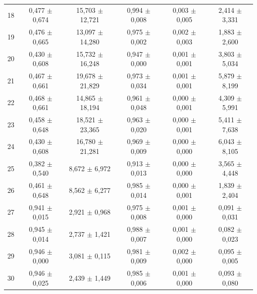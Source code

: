\begin{tabular}{l c c c c c}
18 & 0,477 $\pm$ 0,674 & 15,703 $\pm$ 12,721 & 0,994 $\pm$ 0,008 & 0,003 $\pm$ 0,005 & 2,414 $\pm$ 3,331 \\
19 & 0,476 $\pm$ 0,665 & 13,097 $\pm$ 14,280 & 0,975 $\pm$ 0,002 & 0,002 $\pm$ 0,003 & 1,883 $\pm$ 2,600 \\
20 & 0,430 $\pm$ 0,608 & 15,732 $\pm$ 16,248 & 0,947 $\pm$ 0,000 & 0,001 $\pm$ 0,001 & 3,803 $\pm$ 5,034 \\
21 & 0,467 $\pm$ 0,661 & 19,678 $\pm$ 21,829 & 0,973 $\pm$ 0,034 & 0,001 $\pm$ 0,001 & 5,879 $\pm$ 8,199 \\
22 & 0,468 $\pm$ 0,661 & 14,865 $\pm$ 18,194 & 0,961 $\pm$ 0,048 & 0,000 $\pm$ 0,001 & 4,309 $\pm$ 5,991 \\
23 & 0,458 $\pm$ 0,648 & 18,521 $\pm$ 23,365 & 0,963 $\pm$ 0,020 & 0,000 $\pm$ 0,001 & 5,411 $\pm$ 7,638 \\
24 & 0,430 $\pm$ 0,608 & 16,780 $\pm$ 21,281 & 0,969 $\pm$ 0,009 & 0,000 $\pm$ 0,000 & 6,043 $\pm$ 8,105 \\
25 & 0,382 $\pm$ 0,540 & 8,672 $\pm$ 6,972 & 0,913 $\pm$ 0,013 & 0,000 $\pm$ 0,000 & 3,565 $\pm$ 4,448 \\
26 & 0,461 $\pm$ 0,648 & 8,562 $\pm$ 6,277 & 0,985 $\pm$ 0,014 & 0,000 $\pm$ 0,001 & 1,839 $\pm$ 2,404 \\
27 & 0,941 $\pm$ 0,015 & 2,921 $\pm$ 0,968 & 0,975 $\pm$ 0,008 & 0,001 $\pm$ 0,000 & 0,091 $\pm$ 0,031 \\
28 & 0,945 $\pm$ 0,014 & 2,737 $\pm$ 1,421 & 0,988 $\pm$ 0,007 & 0,001 $\pm$ 0,000 & 0,082 $\pm$ 0,023 \\
29 & 0,946 $\pm$ 0,000 & 3,081 $\pm$ 0,115 & 0,981 $\pm$ 0,009 & 0,002 $\pm$ 0,000 & 0,095 $\pm$ 0,005 \\
30 & 0,946 $\pm$ 0,025 & 2,439 $\pm$ 1,449 & 0,985 $\pm$ 0,006 & 0,001 $\pm$ 0,000 & 0,093 $\pm$ 0,080 \\
\hline 
 \end{tabular}

